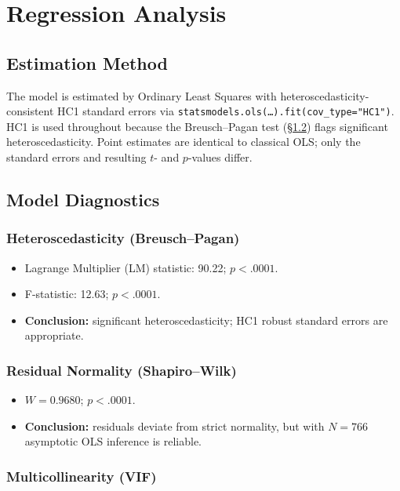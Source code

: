 \documentclass[12pt,a4paper]{article}
\begin{document}
\newpage

\section{Regression Analysis}

\subsection{Estimation Method}

The model is estimated by Ordinary Least Squares with heteroscedasticity-consistent HC1 standard errors via \texttt{statsmodels.ols(\ldots).fit(cov\_type="HC1")}. HC1 is used throughout because the Breusch--Pagan test (§\ref{sec:diag}) flags significant heteroscedasticity. Point estimates are identical to classical OLS; only the standard errors and resulting $t$- and $p$-values differ.

\subsection{Model Diagnostics}
\label{sec:diag}

\subsubsection{Heteroscedasticity (Breusch--Pagan)}
\begin{itemize}
    \item Lagrange Multiplier (LM) statistic: 90.22; $p<.0001$.
    \item F-statistic: 12.63; $p<.0001$.
    \item \textbf{Conclusion:} significant heteroscedasticity; HC1 robust standard errors are appropriate.
\end{itemize}

\subsubsection{Residual Normality (Shapiro--Wilk)}
\begin{itemize}
    \item $W = 0.9680$; $p<.0001$.
    \item \textbf{Conclusion:} residuals deviate from strict normality, but with $N=766$ asymptotic OLS inference is reliable.
\end{itemize}

\subsubsection{Multicollinearity (VIF)}
\end{document}
